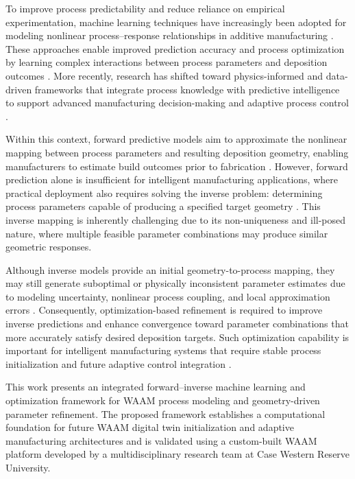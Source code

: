 \documentclass[11pt]{article}
\begin{document}
To improve process predictability and reduce reliance on empirical experimentation, machine learning techniques have increasingly been adopted for modeling nonlinear process--response relationships in additive manufacturing \cite{Wang2026}. These approaches enable improved prediction accuracy and process optimization by learning complex interactions between process parameters and deposition outcomes \cite{Meng2020,Zhu2018,Karkaria2024}. More recently, research has shifted toward physics-informed and data-driven frameworks that integrate process knowledge with predictive intelligence to support advanced manufacturing decision-making and adaptive process control \cite{Chen2025MPC,Guo2021MLAM,Cooper2023}.

Within this context, forward predictive models aim to approximate the nonlinear mapping between process parameters and resulting deposition geometry, enabling manufacturers to estimate build outcomes prior to fabrication \cite{Ding2015}. However, forward prediction alone is insufficient for intelligent manufacturing applications, where practical deployment also requires solving the inverse problem: determining process parameters capable of producing a specified target geometry \cite{Jamhari2026}. This inverse mapping is inherently challenging due to its non-uniqueness and ill-posed nature, where multiple feasible parameter combinations may produce similar geometric responses.

Although inverse models provide an initial geometry-to-process mapping, they may still generate suboptimal or physically inconsistent parameter estimates due to modeling uncertainty, nonlinear process coupling, and local approximation errors \cite{Tarantola2005,Rooney2026}. Consequently, optimization-based refinement is required to improve inverse predictions and enhance convergence toward parameter combinations that more accurately satisfy desired deposition targets. Such optimization capability is important for intelligent manufacturing systems that require stable process initialization and future adaptive control integration \cite{Frazier2018,Karimzadeh2024FGM,Zhang2025IntelligentAM}.

This work presents an integrated forward--inverse machine learning and optimization framework for WAAM process modeling and geometry-driven parameter refinement. The proposed framework establishes a computational foundation for future WAAM digital twin initialization and adaptive manufacturing architectures and is validated using a custom-built WAAM platform developed by a multidisciplinary research team at Case Western Reserve University. 
\end{document}

